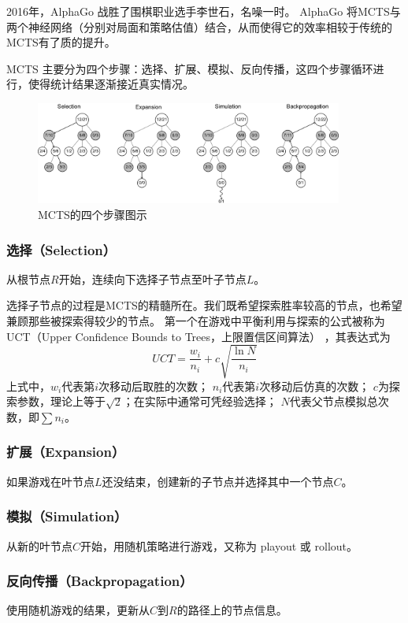 \documentclass[12pt]{ctexart}
\begin{document}
	2016年，AlphaGo 战胜了围棋职业选手李世石，名噪一时。 AlphaGo 将MCTS与两个神经网络（分别对局面和策略估值）结合，从而使得它的效率相较于传统的MCTS有了质的提升。

	MCTS 主要分为四个步骤：选择、扩展、模拟、反向传播，这四个步骤循环进行，使得统计结果逐渐接近真实情况。

	\begin{figure}[H]
		\centering
		\includegraphics[width = 0.9\textwidth]{MCTS.png}
		\caption{MCTS的四个步骤图示}
	\end{figure}
	
	\subsubsection{选择（Selection）}
	从根节点$R$开始，连续向下选择子节点至叶子节点$L$。

	选择子节点的过程是MCTS的精髓所在。我们既希望探索胜率较高的节点，也希望兼顾那些被探索得较少的节点。
	第一个在游戏中平衡利用与探索的公式被称为UCT（Upper Confidence Bounds to Trees，上限置信区间算法）
	，其表达式为
	\[UCT = \frac{w_i}{n_i}+c\sqrt{\frac{\ln{N}}{n_i}}\]
	上式中，$w_{i}$代表第$i$次移动后取胜的次数；
	$n_i$代表第$i$次移动后仿真的次数；
	$c$为探索参数，理论上等于$\sqrt{2}$；在实际中通常可凭经验选择；
	$N$代表父节点模拟总次数，即$\sum n_i$。

	\subsubsection{扩展（Expansion）}
	如果游戏在叶节点$L$还没结束，创建新的子节点并选择其中一个节点$C$。

	\subsubsection{模拟（Simulation）}
	从新的叶节点$C$开始，用随机策略进行游戏，又称为 playout 或 rollout。

	\subsubsection{反向传播（Backpropagation）}
	使用随机游戏的结果，更新从$C$到$R$的路径上的节点信息。
	
\end{document}

